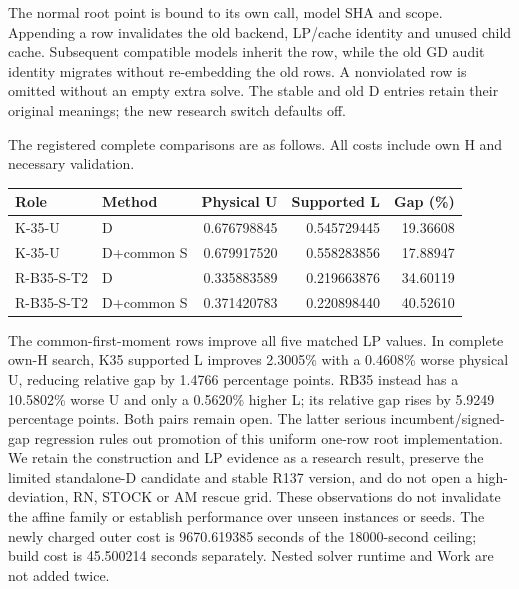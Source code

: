 The normal root point is bound to its own call, model SHA and scope.
Appending a row invalidates the old backend, LP/cache identity and unused
child cache. Subsequent compatible models inherit the row, while the old
GD audit identity migrates without re-embedding the old rows. A nonviolated
row is omitted without an empty extra solve. The stable and old D entries
retain their original meanings; the new research switch defaults off.


The registered complete comparisons are as follows. All costs include own H and necessary validation.
\begin{center}
\begin{tabular}{llrrr}
Role & Method & Physical U & Supported L & Gap (\%)\\
\hline
K-35-U & D & 0.676798845 & 0.545729445 & 19.36608\\
K-35-U & D+common S & 0.679917520 & 0.558283856 & 17.88947\\
R-B35-S-T2 & D & 0.335883589 & 0.219663876 & 34.60119\\
R-B35-S-T2 & D+common S & 0.371420783 & 0.220898440 & 40.52610\\
\end{tabular}
\end{center}
The common-first-moment rows improve all five matched LP values. In complete own-H search, K35 supported L improves 2.3005\% with a 0.4608\% worse physical U, reducing relative gap by 1.4766 percentage points. RB35 instead has a 10.5802\% worse U and only a 0.5620\% higher L; its relative gap rises by 5.9249 percentage points. Both pairs remain open. The latter serious incumbent/signed-gap regression rules out promotion of this uniform one-row root implementation. We retain the construction and LP evidence as a research result, preserve the limited standalone-D candidate and stable R137 version, and do not open a high-deviation, RN, STOCK or AM rescue grid. These observations do not invalidate the affine family or establish performance over unseen instances or seeds.
The newly charged outer cost is 9670.619385 seconds of the 18000-second ceiling; build cost is 45.500214 seconds separately. Nested solver runtime and Work are not added twice.
